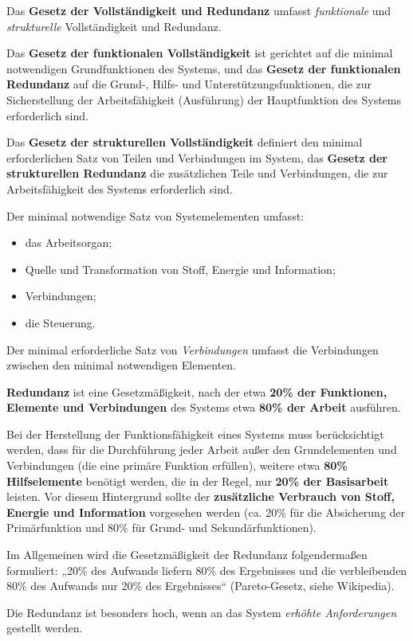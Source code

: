 \documentclass[11pt,a4paper]{article}
\begin{document}
Das \textbf{Gesetz der Vollständigkeit und Redundanz} umfasst
\emph{funktionale} und \emph{strukturelle} Vollständigkeit und Redundanz.

Das \textbf{Gesetz der funktionalen Vollständigkeit} ist gerichtet auf die
minimal notwendigen Grundfunktionen des Systems, und das \textbf{Gesetz der
  funktionalen Redundanz} auf die Grund-, Hilfs- und Unterstützungsfunktionen,
die zur Sicherstellung der Arbeitsfähigkeit (Ausführung) der Hauptfunktion des
Systems erforderlich sind.

Das \textbf{Gesetz der strukturellen Vollständigkeit} definiert den minimal
erforderlichen Satz von Teilen und Verbindungen im System, das \textbf{Gesetz
  der strukturellen Redundanz} die zusätzlichen Teile und Verbindungen, die
zur Arbeitsfähigkeit des Systems erforderlich sind.

Der minimal notwendige Satz von Systemelementen umfasst:
\begin{itemize}[noitemsep]
\item das Arbeitsorgan;
\item Quelle und Transformation von Stoff, Energie und Information;
\item Verbindungen;
\item die Steuerung.
\end{itemize}
Der minimal erforderliche Satz von \emph{Verbindungen} umfasst die
Verbindungen zwischen den minimal notwendigen Elementen.

\textbf{Redundanz} ist eine Gesetzmäßigkeit, nach der etwa \textbf{20\% der
  Funktionen, Elemente und Verbindungen} des Systems etwa \textbf{80\% der
  Arbeit} ausführen.

Bei der Herstellung der Funktionsfähigkeit eines Systems muss berücksichtigt
werden, dass für die Durchführung jeder Arbeit außer den Grundelementen und
Verbindungen (die eine primäre Funktion erfüllen), weitere etwa \textbf{80\%
  Hilfselemente} benötigt werden, die in der Regel, nur \textbf{20\% der
  Basisarbeit} leisten. Vor diesem Hintergrund sollte der \textbf{zusätzliche
  Verbrauch von Stoff, Energie und Information} vorgesehen werden (ca. 20\%
für die Absicherung der Primärfunktion und 80\% für Grund- und
Sekundärfunktionen).

Im Allgemeinen wird die Gesetzmäßigkeit der Redundanz folgendermaßen
formuliert: „20\% des Aufwands liefern 80\% des Ergebnisses und die
verbleibenden 80\% des Aufwands nur 20\% des Ergebnisses“ (Pareto-Gesetz,
siehe Wikipedia).

Die Redundanz ist besonders hoch, wenn an das System \emph{erhöhte
  Anforderungen} gestellt werden.
\end{document}
